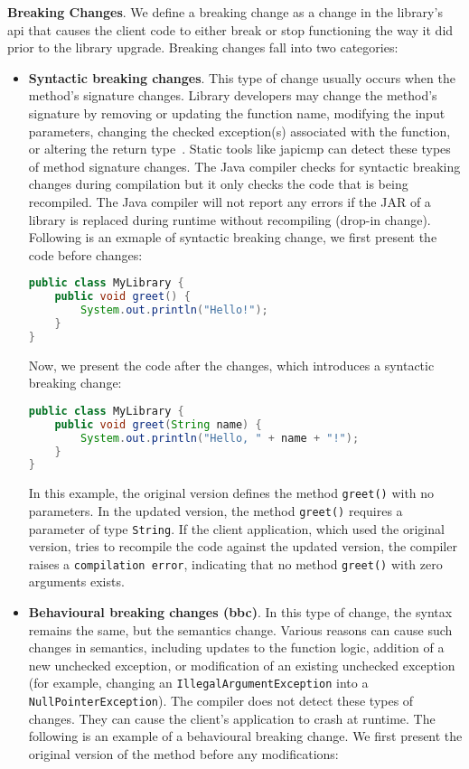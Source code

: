 \textbf{Breaking Changes}. We define a breaking change as a change in the library's \gls{api} that
causes the client code to either break or stop functioning the way it did prior to the library upgrade.
Breaking changes fall into two categories:
\begin{itemize}
    \item \textbf{Syntactic breaking changes}. This type of change usually occurs when the method's
    signature changes. Library developers may change the method's signature by removing or updating
    the function name, modifying the input parameters, changing the checked exception(s) associated
    with the function, or altering the return type~\cite{jayasuriya24}. Static tools like japicmp
    can detect these types of method signature changes. The Java compiler checks for syntactic breaking
    changes during compilation but it only checks the code that is being recompiled. The Java compiler
    will not report any errors if the JAR of a library is replaced during runtime without recompiling
    (drop-in change). Following is an exmaple of syntactic breaking change, we first present the code
    before changes:
    \begin{lstlisting}[language=java]
public class MyLibrary {
    public void greet() {
        System.out.println("Hello!");
    }
}
    \end{lstlisting}
    Now, we present the code after the changes, which introduces a syntactic breaking change:
    \begin{lstlisting}[language=java]
public class MyLibrary {
    public void greet(String name) {
        System.out.println("Hello, " + name + "!");
    }
}
    \end{lstlisting}
    In this example, the original version defines the method \texttt{greet()} with no parameters. In
    the updated version, the method \texttt{greet()} requires a parameter of type \texttt{String}. If
    the client application, which used the original version, tries to recompile the code against the
    updated version, the compiler raises a \texttt{compilation error}, indicating that no method
    \texttt{greet()} with zero arguments exists.

    \item \textbf{Behavioural breaking changes (\gls{bbc})}. In this type of change, the syntax remains
    the same, but the semantics change. Various reasons can cause such changes in semantics, including
    updates to the function logic, addition of a new unchecked exception, or modification of an existing
    unchecked exception (for example, changing an \texttt{IllegalArgumentException} into a
    \texttt{NullPointerException}). The compiler does not detect these types of changes.
    They can cause the client's application to crash at runtime. The following is an example of a
    behavioural breaking change. We first present the original version of the method before any modifications:


\end{itemize}
